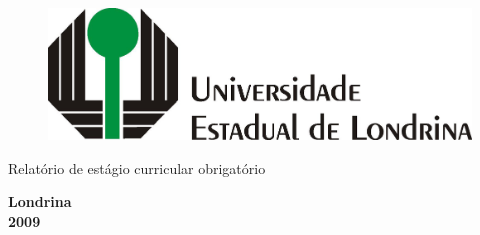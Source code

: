 \thispagestyle{empty}

\begin{figure}[htb]
    \begin{center}
        \includegraphics[scale=0.9]{./figuras/p-modelo1.jpg}
    \end{center}
\end{figure}

\begin{center}
    Relatório de estágio curricular obrigatório

\end{center}


\begin{center}
\end{center}



\begin{center}
    \bf{Londrina \\ 2009}
\end{center}